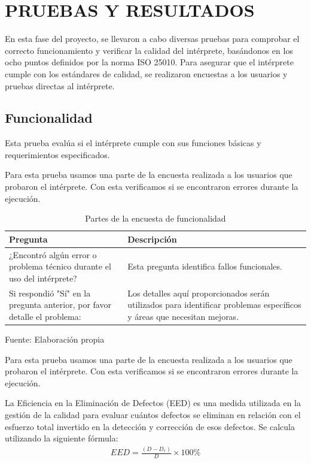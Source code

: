 \chapter{PRUEBAS Y RESULTADOS}
En esta fase del proyecto, se llevaron a cabo diversas pruebas para comprobar el correcto funcionamiento y verificar la calidad del intérprete, basándonos en los ocho puntos definidos por la norma ISO 25010. Para asegurar que el intérprete cumple con los estándares de calidad, se realizaron encuestas a los usuarios y pruebas directas al intérprete.

\section{Funcionalidad}
Esta prueba evalúa si el intérprete cumple con sus funciones básicas y requerimientos especificados.

Para esta prueba usamos una parte de la encuesta realizada a los usuarios que probaron el intérprete. Con esta verificamos si se encontraron errores durante la ejecución.
\begin{table}[!h]
  \begin{center}
    \begin{tabularx}{0.9\textwidth}{|X|X|}
      \hline
      \textbf{Pregunta} & \textbf{Descripción} \\
      \hline
      ¿Encontró algún error o problema técnico durante el uso del intérprete? & Esta pregunta identifica fallos funcionales. \\
      \hline
      Si respondió "Sí" en la pregunta anterior, por favor detalle el problema: & Los detalles aquí proporcionados serán utilizados para identificar problemas específicos y áreas que necesitan mejoras. \\
      \hline
    \end{tabularx}
  \end{center}
  \caption{Partes de la encuesta de funcionalidad}
  \centering Fuente: Elaboración propia
  \label{tab:funcionalidad}
\end{table}

Para esta prueba usamos una parte de la encuesta realizada a los usuarios que probaron el intérprete. Con esta verificamos si se encontraron errores durante la ejecución.

La Eficiencia en la Eliminación de Defectos (EED) es una medida utilizada en la gestión de la calidad para evaluar cuántos defectos se eliminan en relación con el esfuerzo total invertido en la detección y corrección de esos defectos. Se calcula utilizando la siguiente fórmula:
\begin{equation*}
  \begin{split}
    EED = \frac{(D - D_r)}{D} \times 100\%
  \end{split}
\end{equation*}

